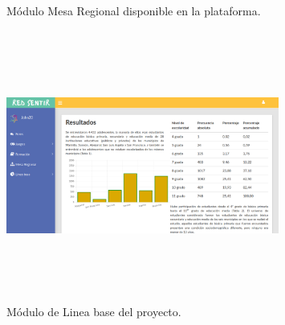 \documentclass[a4paper]{article}
\begin{document}
\begin{figure}[tbp]
  \centering
	  \hspace{1mm}
  \caption{Módulo Mesa Regional disponible en la plataforma. }
  \label{fig:mesa}
\end{figure}

\begin{figure}[t]
\centering
\includegraphics[width=0.8\textwidth,height=3.5in]{resultados.png}
\caption{Módulo de Linea base del proyecto.}
\label{fig:lineabase}
\end{figure}
\end{document}
